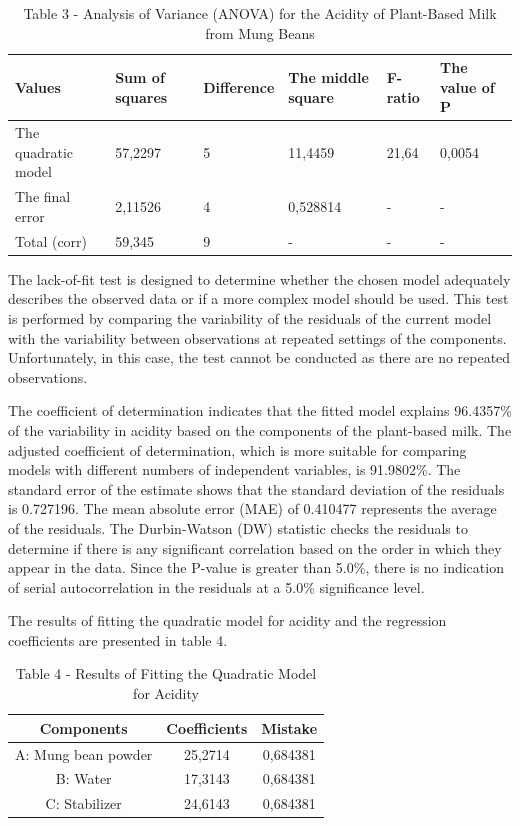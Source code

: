 \begin{table}[H]
\caption*{Table 3 - Analysis of Variance (ANOVA) for the Acidity of Plant-Based Milk from Mung Beans}
\centering
\begin{tabular}{|l|l|l|l|l|l|}
\hline
Values              & Sum of squares & Difference & The middle square & F-ratio & The value of P \\ \hline
The quadratic model & 57,2297        & 5          & 11,4459           & 21,64   & 0,0054         \\ \hline
The final error     & 2,11526        & 4          & 0,528814          & -       & -              \\ \hline
Total (corr)        & 59,345         & 9          & -                 & -       & -              \\ \hline
\end{tabular}
\end{table}

The lack-of-fit test is designed to determine whether the chosen model
adequately describes the observed data or if a more complex model should
be used. This test is performed by comparing the variability of the
residuals of the current model with the variability between observations
at repeated settings of the components. Unfortunately, in this case, the
test cannot be conducted as there are no repeated observations.

The coefficient of determination indicates that the fitted model
explains 96.4357\% of the variability in acidity based on the components
of the plant-based milk. The adjusted coefficient of determination,
which is more suitable for comparing models with different numbers of
independent variables, is 91.9802\%. The standard error of the estimate
shows that the standard deviation of the residuals is 0.727196. The mean
absolute error (MAE) of 0.410477 represents the average of the
residuals. The Durbin-Watson (DW) statistic checks the residuals to
determine if there is any significant correlation based on the order in
which they appear in the data. Since the P-value is greater than 5.0\%,
there is no indication of serial autocorrelation in the residuals at a
5.0\% significance level.

The results of fitting the quadratic model for acidity and the
regression coefficients are presented in table 4.

\begin{table}[H]
\caption*{Table 4 - Results of Fitting the Quadratic Model for Acidity}
\centering
\begin{tabular}{|c|c|c|}
\hline
Components          & Coefficients & Mistake  \\ \hline
A: Mung bean powder & 25,2714      & 0,684381 \\ \hline
B: Water            & 17,3143      & 0,684381 \\ \hline
C: Stabilizer       & 24,6143      & 0,684381 \\ \hline
\end{tabular}
\end{table}

